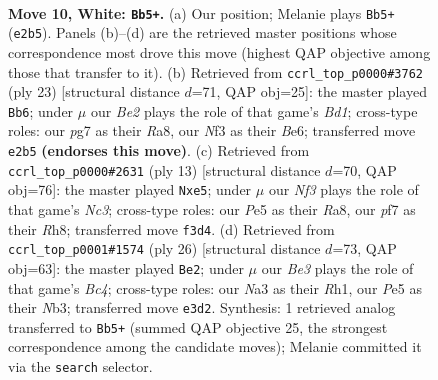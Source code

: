 \documentclass[11pt]{article}
\begin{document}
\begin{figure}[p]
\label{fig:thought-m16}
\end{figure}

\clearpage

\begin{figure}[p]\centering
\begin{subfigure}{0.46\textwidth}\centering
\resizebox{\linewidth}{!}{%
\newchessgame
\chessboard[
  setfen={rn2kbnr/pp3ppp/4p3/3pPb2/3p4/N3BN2/P1P1BPPP/2R1K2R w Kkq - 0 10},
  showmover=false,
  pgfstyle=straightmove, color=movearrow, markmove={e2-b5}
]}
\caption{}
\end{subfigure}\hfill
\begin{subfigure}{0.46\textwidth}\centering
\resizebox{\linewidth}{!}{%
\newchessgame
\chessboard[
  setfen={r2bk2r/1p3ppp/2p1bn2/p3p1B1/P3P3/1P3P2/2P3PP/R2NKB1R b KQkq - 0 12},
  showmover=false,
  pgfstyle=straightmove, color=movearrow, markmove={d8-b6}
]}
\caption{}
\end{subfigure}
\\[4pt]
\begin{subfigure}{0.46\textwidth}\centering
\resizebox{\linewidth}{!}{%
\newchessgame
\chessboard[
  setfen={r1bk2nr/ppp2ppp/2nb4/4P3/4P3/2N5/PPP3PP/R1B1KBNR b KQ - 0 7},
  showmover=false,
  pgfstyle=straightmove, color=movearrow, markmove={c6-e5}
]}
\caption{}
\end{subfigure}\hfill
\begin{subfigure}{0.46\textwidth}\centering
\resizebox{\linewidth}{!}{%
\newchessgame
\chessboard[
  setfen={rnb1k2r/b4pp1/p3p2p/1p6/2B1PPn1/1NN3P1/PP1B3P/R3K2R w KQkq - 0 14},
  showmover=false,
  pgfstyle=straightmove, color=movearrow, markmove={c4-e2}
]}
\caption{}
\end{subfigure}
\caption{\textbf{Move 10, White: \texttt{Bb5+}.} (a) Our position; Melanie plays \texttt{Bb5+} (\texttt{e2b5}). Panels (b)--(d) are the retrieved master positions whose correspondence most drove this move (highest QAP objective among those that transfer to it). (b) Retrieved from \texttt{ccrl\_top\_p0000\#3762} (ply 23) [structural distance $d$=71, QAP obj=25]: the master played \texttt{Bb6}; under $\mu$ our \emph{Be2} plays the role of that game's \emph{Bd1}; cross-type roles: our \emph{p}g7 as their \emph{R}a8, our \emph{N}f3 as their \emph{B}e6; transferred move \texttt{e2b5} \textbf{(endorses this move)}. (c) Retrieved from \texttt{ccrl\_top\_p0000\#2631} (ply 13) [structural distance $d$=70, QAP obj=76]: the master played \texttt{Nxe5}; under $\mu$ our \emph{Nf3} plays the role of that game's \emph{Nc3}; cross-type roles: our \emph{P}e5 as their \emph{R}a8, our \emph{p}f7 as their \emph{R}h8; transferred move \texttt{f3d4}. (d) Retrieved from \texttt{ccrl\_top\_p0001\#1574} (ply 26) [structural distance $d$=73, QAP obj=63]: the master played \texttt{Be2}; under $\mu$ our \emph{Be3} plays the role of that game's \emph{Bc4}; cross-type roles: our \emph{N}a3 as their \emph{R}h1, our \emph{P}e5 as their \emph{N}b3; transferred move \texttt{e3d2}. Synthesis: 1 retrieved analog transferred to \texttt{Bb5+} (summed QAP objective 25, the strongest correspondence among the candidate moves); Melanie committed it via the \texttt{search} selector.}
\label{fig:thought-m18}
\end{figure}
\end{document}
